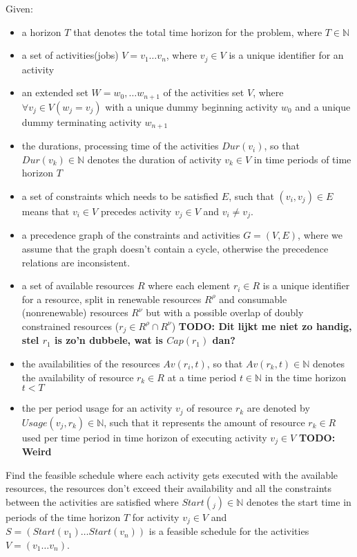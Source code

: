 \documentclass{article}
\newcommand{\TODO}[1]{{\color{red}\textbf{TODO: #1}}}
\newcommand{\renres}[0]{R^\rho} %
\newcommand{\conres}[0]{R^\nu} %
\newcommand{\av}[1]{\textit{Av}(#1)} %
\newcommand{\dur}[1]{\textit{Dur}(#1)} %
\newcommand{\usage}[1]{\textit{Usage}(#1)} %
\newcommand{\start}[1]{\textit{Start}(#1)} %
\begin{document}
Given:
\begin{itemize}
\item a horizon $T$ that denotes the total time horizon for the problem, where $T \in \mathbb{N}$
\item a set of activities(jobs) $V = v_1 \ldots v_n$, where $v_j \in V$ is a unique identifier for an activity
\item an extended set $W = w_0, \ldots w_{n+1}$ of the activities set $V$, where $\forall v_j \in V (w_j = v_j)$ with a unique dummy beginning activity $w_0$ and a unique dummy terminating activity $w_{n+1}$
\item the durations, processing time of the activities $\dur{v_i}$, so that $\dur{v_k} \in \mathbb{N}$ denotes the duration of activity $v_k \in V$ in time periods of time horizon $T$
\item a set of constraints which needs to be satisfied $E$, such that $(v_i,v_j) \in E$ means that $v_i \in V$ precedes activity $v_j \in V$ and $v_i \neq v_j$.
\item a precedence graph of the constraints and activities $G = (V, E)$, where we assume that the graph doesn't contain a cycle, otherwise the precedence relations are inconsistent.
\item a set of available resources $R$ where each element $r_i \in R$ is a unique identifier for a resource, split in renewable resources $\renres$ and  consumable (nonrenewable) resources $\conres$ but with a possible overlap of doubly constrained resources ($r_j \in \renres \cap \conres$) \TODO{Dit lijkt me niet zo handig, stel $r_1$ is zo'n dubbele, wat is $Cap(r_1)$ dan?}
\item the availabilities of the resources $\av{r_i, t}$, so that $\av{r_k, t} \in \mathbb{N}$ denotes the availability of resource $r_k \in R$ at a time period $t \in \mathbb{N}$ in the time horizon $t < T$
\item the per period usage for an activity $v_j$ of resource $r_k$ are denoted by $\usage{v_j, r_k} \in \mathbb{N}$, such that it represents the amount of resource $r_k \in R$ used per time period in time horizon of executing activity $v_j \in V$ \TODO{Weird}
\end{itemize}

Find the feasible schedule where each activity gets executed with the available resources, the resources don't exceed their availability and all the constraints between the activities are satisfied where $\start{_j} \in \mathbb{N}$ denotes the start time in periods of the time horizon $T$ for activity $v_j \in V$ and
$S = (\start{v_1} \ldots \start{v_n})$ is a feasible schedule for the activities $V = (v_1 \ldots v_n)$.
\end{document}
